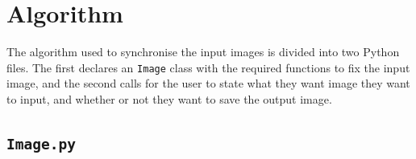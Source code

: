 \documentclass[a4paper,12pt]{article}
\begin{document}
\newpage

\appendix

\section{Algorithm}

The algorithm used to synchronise the input images is divided into two Python files. The first declares an \texttt{Image} class with the required functions to fix the input image, and the second calls for the user to state what they want image they want to input, and whether or not they want to save the output image. 

\subsection{\texttt{Image.py}}
\end{document}
